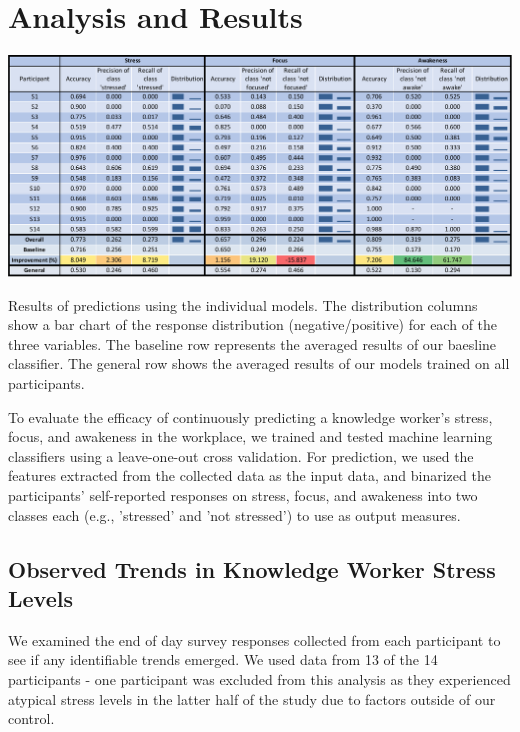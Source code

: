 %

\section{Analysis and Results}

\begin{table}[h]
  \centering
  \includegraphics[width=1.0\textwidth]{rq1performance.pdf}
  \caption{Results of predictions using the individual models. The distribution columns show a bar chart of the response distribution (negative/positive) for each of the three variables. The baseline row represents the averaged results of our baesline classifier. The general row shows the averaged results of our models trained on all participants.}\label{tab:accuracy}%
  \vspace*{-4mm}
\end{table}

To evaluate the efficacy of continuously predicting a knowledge worker's stress, focus, and awakeness in the workplace, we trained and tested machine learning classifiers using a leave-one-out cross validation. For prediction, we used the features extracted from the collected data as the input data, and binarized the participants' self-reported responses on stress, focus, and awakeness into two classes each (e.g., 'stressed' and 'not stressed') to use as output measures.

\subsection{Observed Trends in Knowledge Worker Stress Levels}
We examined the end of day survey responses collected from each participant to see if any identifiable trends emerged. We used data from 13 of the 14 participants - one participant was excluded from this analysis as they experienced atypical stress levels in the latter half of the study due to factors outside of our control.

